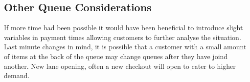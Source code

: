 \documentclass[pdftex,a4paper,10pt,titlepage]{article}
\begin{document}
\subsection{Other Queue Considerations} 
If more time had been possible it would have been beneficial to introduce slight variables in payment times allowing customers to further analyse the situation. Last minute changes in mind, it is possible that a customer with a small amount of items at the back of the queue may change queues after they have joind another. New lane opening, often a new checkout will open to cater to higher demand.










\end{document}

